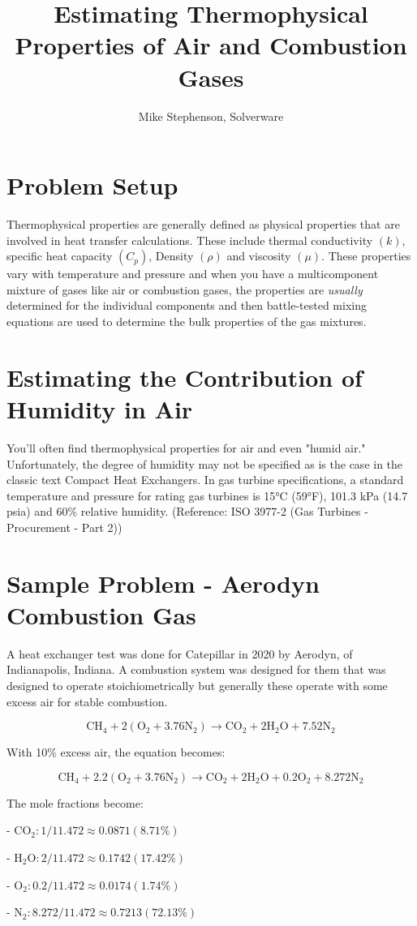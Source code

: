 \documentclass[]{article}
\begin{document}
\title{Estimating Thermophysical Properties of Air and Combustion Gases}
\author{Mike Stephenson, Solverware}
	
	
\section{Problem Setup}
Thermophysical properties are generally defined as physical properties that are involved in heat transfer calculations. These include thermal conductivity $(k)$, specific heat capacity $(C_p)$, Density $(\rho)$ and viscosity $(\mu)$. These properties vary with temperature and pressure and when you have a multicomponent mixture of gases like air or combustion gases, the properties are \textit{usually} determined for the individual components and then battle-tested mixing equations are used to determine the bulk properties of the gas mixtures.
\section{Estimating the Contribution of Humidity in Air}
You'll often find thermophysical properties for air and even "humid air." Unfortunately, the degree of humidity may not be specified as is the case in the classic text Compact Heat Exchangers. In gas turbine specifications, a standard temperature and pressure for rating gas turbines is 15°C (59°F), 101.3 kPa (14.7 psia) and 60\% relative humidity. (Reference: ISO 3977-2 (Gas Turbines - Procurement - Part 2))

\section{Sample Problem - Aerodyn Combustion Gas}
A heat exchanger test was done for Catepillar in 2020 by Aerodyn, of Indianapolis, Indiana. A combustion system was designed for them that was designed to operate stoichiometrically but generally these operate with some excess air for stable combustion.

$$ \text{CH}_4 + 2(\text{O}_2 + 3.76\text{N}_2) \rightarrow \text{CO}_2 + 2\text{H}_2\text{O} + 7.52\text{N}_2 $$

With 10\% excess air, the equation becomes:

$$ \text{CH}_4 + 2.2(\text{O}_2 + 3.76\text{N}_2) \rightarrow \text{CO}_2 + 2\text{H}_2\text{O} + 0.2\text{O}_2 + 8.272\text{N}_2 $$

The mole fractions become:

- $ \text{CO}_2: 1/11.472 \approx 0.0871 (8.71\%) $

- $ \text{H}_2\text{O}:  2/11.472 \approx 0.1742 (17.42\%) $
	
- $ \text{O}_2: 0.2/11.472 \approx 0.0174 (1.74\%) $

- $ \text{N}_2: 8.272/11.472 \approx 0.7213 (72.13\%) $
\end{document}
